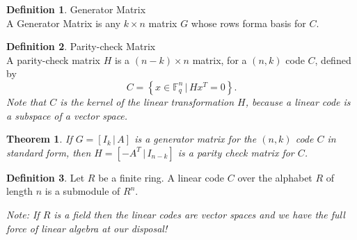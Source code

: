 \documentclass{article}
\newcommand{\F}{\mathbb{F}}
\newtheorem{theorem}{Theorem}
\theoremstyle{definition}
\newtheorem{definition}{Definition}
\begin{document}
\begin{definition}{Generator Matrix}\\
  A Generator Matrix is any $k\times n$ matrix $G$ whose rows forma  basis for $C$.
\end{definition}

\begin{definition}{Parity-check Matrix}\\
  A parity-check matrix $H$ is a $(n-k)\times n$ matrix, for a $(n,k)$ code $C$, defined by \[C = \left\{x\in\F^n_q \,|\, Hx^T = 0\right\}.\] \textit{Note that $C$ is the kernel of the linear transformation $H$, because a linear code is a subspace of a vector space.}
\end{definition}

\begin{theorem}
  If $G = [I_k \,|\, A]$ is a generator matrix for the $(n,k)$ code $C$ in standard form, then $H = [-A^T \,|\, I_{n-k}]$ is a parity check matrix for $C$.
\end{theorem}

\begin{definition}
  Let $R$ be a finite ring. A linear code $C$ over the alphabet $R$ of length $n$ is a submodule of $R^n$.
\end{definition}
\textit{Note: If $R$ is a field then the linear codes are vector spaces and we have the full force of linear algebra at our disposal!}
\end{document}
